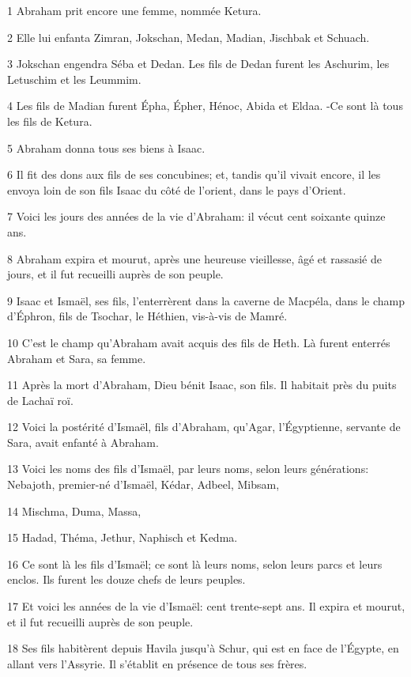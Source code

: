 \par 1 Abraham prit encore une femme, nommée Ketura.
\par 2 Elle lui enfanta Zimran, Jokschan, Medan, Madian, Jischbak et Schuach.
\par 3 Jokschan engendra Séba et Dedan. Les fils de Dedan furent les Aschurim, les Letuschim et les Leummim.
\par 4 Les fils de Madian furent Épha, Épher, Hénoc, Abida et Eldaa. -Ce sont là tous les fils de Ketura.
\par 5 Abraham donna tous ses biens à Isaac.
\par 6 Il fit des dons aux fils de ses concubines; et, tandis qu'il vivait encore, il les envoya loin de son fils Isaac du côté de l'orient, dans le pays d'Orient.
\par 7 Voici les jours des années de la vie d'Abraham: il vécut cent soixante quinze ans.
\par 8 Abraham expira et mourut, après une heureuse vieillesse, âgé et rassasié de jours, et il fut recueilli auprès de son peuple.
\par 9 Isaac et Ismaël, ses fils, l'enterrèrent dans la caverne de Macpéla, dans le champ d'Éphron, fils de Tsochar, le Héthien, vis-à-vis de Mamré.
\par 10 C'est le champ qu'Abraham avait acquis des fils de Heth. Là furent enterrés Abraham et Sara, sa femme.
\par 11 Après la mort d'Abraham, Dieu bénit Isaac, son fils. Il habitait près du puits de Lachaï roï.
\par 12 Voici la postérité d'Ismaël, fils d'Abraham, qu'Agar, l'Égyptienne, servante de Sara, avait enfanté à Abraham.
\par 13 Voici les noms des fils d'Ismaël, par leurs noms, selon leurs générations: Nebajoth, premier-né d'Ismaël, Kédar, Adbeel, Mibsam,
\par 14 Mischma, Duma, Massa,
\par 15 Hadad, Théma, Jethur, Naphisch et Kedma.
\par 16 Ce sont là les fils d'Ismaël; ce sont là leurs noms, selon leurs parcs et leurs enclos. Ils furent les douze chefs de leurs peuples.
\par 17 Et voici les années de la vie d'Ismaël: cent trente-sept ans. Il expira et mourut, et il fut recueilli auprès de son peuple.
\par 18 Ses fils habitèrent depuis Havila jusqu'à Schur, qui est en face de l'Égypte, en allant vers l'Assyrie. Il s'établit en présence de tous ses frères.
